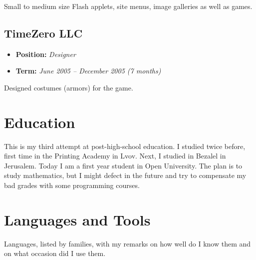 \documentclass[oneside]{memoir}
\begin{document}
Small to medium size Flash applets, site menus, image galleries as well as games.
\section{TimeZero LLC}
\label{sec-3-8}
\begin{itemize}
\item \textbf{Position:} \emph{Designer}
\item \textbf{Term:} \emph{June 2005 – December 2005 (7 months)}
\end{itemize}

Designed costumes (armors) for the game.
\chapter{Education}
\label{sec-4}

This is my third attempt at post-high-school education.  I studied twice
before, first time in the Printing Academy in Lvov.  Next, I studied in
Bezalel in Jerusalem.  Today I am a first year student in Open University.
The plan is to study mathematics, but I might defect in the future and
try to compensate my bad grades with some programming courses.
\chapter{Languages and Tools}
\label{sec-5}
Languages, listed by families, with my remarks on how well do I know them and
on what occasion did I use them.
\end{document}
